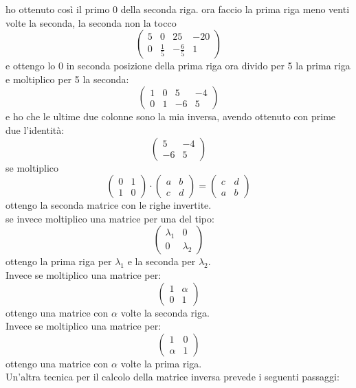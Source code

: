 \documentclass[a4paper,12pt, oneside]{book}
\begin{document}
ho ottenuto così  il primo 0 della seconda riga. ora faccio la prima riga meno venti volte la seconda, la seconda non la tocco
$$
\left(\begin{matrix}
5 & 0 & 25 & -20\\
0 & \frac{1}{5} & -\frac{6}{5} & 1
\end{matrix}\right)
$$
e ottengo lo 0 in seconda posizione della prima riga
\newpage
ora divido per 5 la prima riga e moltiplico per 5 la seconda:
$$
\left(\begin{matrix}
1 & 0 & 5 & -4\\
0 & 1 & -6 & 5
\end{matrix}\right)
$$
e ho che le ultime due colonne sono la mia inversa, avendo ottenuto con prime due l'identità:
$$
\left(\begin{matrix}
5 & -4\\
-6 & 5
\end{matrix}\right)
$$
se moltiplico
$$
\left(\begin{matrix}
0 & 1\\
1 & 0
\end{matrix}\right)\cdot \left(\begin{matrix}
a & b\\
c & d
\end{matrix}\right)= \left(\begin{matrix}
c & d\\
a & b
\end{matrix}\right)
$$
ottengo la seconda matrice con le righe invertite.\\ se invece moltiplico una matrice per una del tipo:
$$
\left(\begin{matrix}
\lambda_1 & 0\\
0 & \lambda_2
\end{matrix}\right)
$$ ottengo la prima riga per $\lambda_1$ e la seconda per $\lambda_2$.\\Invece se moltiplico una matrice per:
$$
\left(\begin{matrix}
1 & \alpha\\
0 & 1
\end{matrix}\right)
$$
ottengo una matrice con $\alpha$ volte la seconda riga.
\\Invece se moltiplico una matrice per:
$$
\left(\begin{matrix}
1 & 0\\
\alpha & 1
\end{matrix}\right)
$$
ottengo una matrice con $\alpha$ volte la prima riga.\\
Un'altra tecnica per il calcolo della matrice inversa prevede i seguenti passaggi:
\end{document}

